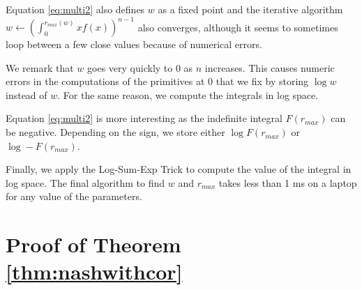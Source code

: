 \documentclass[preprint,12pt,authoryear,doubleblind]{elsarticle}
\theoremstyle{definition}
\begin{document}
Equation \eqref{eq:multi2} also defines $w$ as a fixed point and the iterative algorithm $w \leftarrow \left(\int_0^{{r_{max}}(w)}x f(x)\right)^{n-1}$ also converges, although it seems to sometimes loop between a few close values because of numerical errors.

We remark that $w$ goes very quickly to $0$ as $n$ increases. This causes numeric errors in the computations of the primitives at $0$ that we fix by storing $\log w$ instead of $w$.  For the same reason, we compute the integrals in log space.

Equation \eqref{eq:multi2} is more interesting as the indefinite integral $F({r_{max}})$ can be negative. Depending on the sign, we store either $\log F({r_{max}})$ or $\log -F({r_{max}})$.

Finally, we apply the Log-Sum-Exp Trick to compute the value of the integral in log space. The final algorithm to find $w$ and ${r_{max}}$ takes less than 1 ms on a laptop for any value of the parameters.

\section{Proof of Theorem \ref{thm:nashwithcor}}
\label{proof:nashwithcor}
\end{document}
